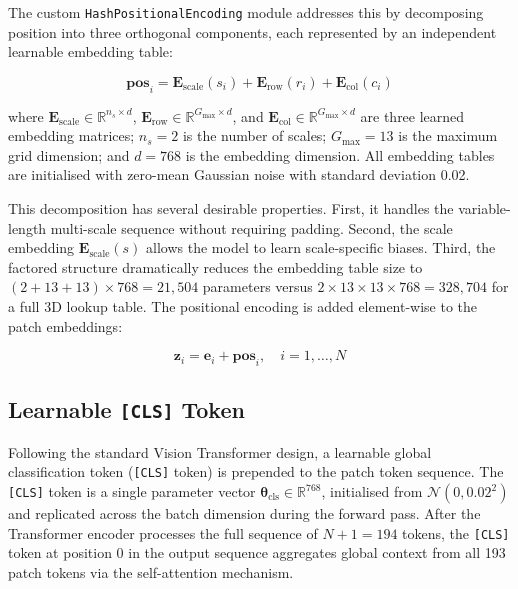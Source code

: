 The custom \texttt{HashPositionalEncoding} module addresses this by decomposing position
into three orthogonal components, each represented by an independent learnable embedding
table:

\begin{equation}
    \mathbf{pos}_i = \mathbf{E}_{\text{scale}}(s_i) + \mathbf{E}_{\text{row}}(r_i)
                   + \mathbf{E}_{\text{col}}(c_i)
\end{equation}

where $\mathbf{E}_{\text{scale}} \in \mathbb{R}^{n_s \times d}$,
$\mathbf{E}_{\text{row}} \in \mathbb{R}^{G_{\max} \times d}$, and
$\mathbf{E}_{\text{col}} \in \mathbb{R}^{G_{\max} \times d}$ are three learned embedding
matrices; $n_s = 2$ is the number of scales; $G_{\max} = 13$ is the maximum grid
dimension; and $d = 768$ is the embedding dimension. All embedding tables are initialised
with zero-mean Gaussian noise with standard deviation 0.02.

This decomposition has several desirable properties. First, it handles the
variable-length multi-scale sequence without requiring padding. Second, the scale
embedding $\mathbf{E}_{\text{scale}}(s)$ allows the model to learn scale-specific
biases. Third, the factored structure dramatically reduces the embedding table size to
$(2 + 13 + 13) \times 768 = 21{,}504$ parameters versus $2 \times 13 \times 13 \times
768 = 328{,}704$ for a full 3D lookup table. The positional encoding is added
element-wise to the patch embeddings:

\begin{equation}
    \mathbf{z}_i = \mathbf{e}_i + \mathbf{pos}_i, \quad i = 1, \ldots, N
\end{equation}

\subsection{Learnable \texttt{[CLS]} Token}

Following the standard Vision Transformer design, a learnable global classification
token (\texttt{[CLS]} token) is prepended to the patch token sequence. The \texttt{[CLS]}
token is a single parameter vector $\boldsymbol{\theta}_{\text{cls}} \in \mathbb{R}^{768}$,
initialised from $\mathcal{N}(0, 0.02^2)$ and replicated across the batch dimension
during the forward pass. After the Transformer encoder processes the full sequence of
$N + 1 = 194$ tokens, the \texttt{[CLS]} token at position 0 in the output sequence
aggregates global context from all 193 patch tokens via the self-attention mechanism.

